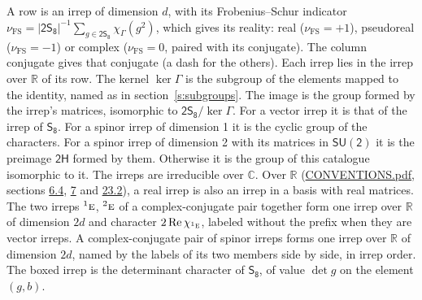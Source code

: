 \documentclass[10pt,a4paper]{article}
\numberwithin{equation}{section}
\newcommand{\grp}[1]{\mathsf{#1}}
\newcommand{\irr}[1]{\text{\normalfont\scshape #1}}
\newcommand{\conjpair}[1]{{}^{#1}}
\newcommand{\irchar}[1]{\chi_{#1}}
\newcommand{\fsind}{\nu_{\mathrm{FS}}}
\begin{document}
\leavevmode\label{n:index.frobenius}\label{n:head.irrep}\label{n:head.reality}A row is an irrep of dimension $d$, with its Frobenius--Schur indicator $\fsind = |\grp{2S_{8}}|^{-1}\allowbreak\sum_{g\in\grp{2S_{8}}}\irchar{\Gamma}(g^2)$, which gives its reality: real ($\fsind = +1$), pseudoreal ($\fsind = -1$) or complex ($\fsind = 0$, paired with its conjugate). \label{n:head.conjugate}The column conjugate gives that conjugate (a dash for the others). \label{n:head.over.real}Each irrep lies in the irrep over $\mathbb{R}$ of its row. \label{n:head.kernel}The kernel $\ker\Gamma$ is the subgroup of the elements mapped to the identity, named as in section~\ref{s:subgroups}. \label{n:head.image}The image is the group formed by the irrep's matrices, isomorphic to $\grp{2S_{8}}/\ker\Gamma$. For a vector irrep it is that of the irrep of \href{../../../rotation/data/pdf/S8.pdf}{$\grp{S_{8}}$}. For a spinor irrep of dimension 1 it is the cyclic group of the characters. For a spinor irrep of dimension 2 with its matrices in $\grp{SU(2)}$ it is the preimage $\grp{2H}$ formed by them. Otherwise it is the group of this catalogue isomorphic to it. The irreps are irreducible over $\mathbb{C}$. Over $\mathbb{R}$ (\href{../../CONVENTIONS.pdf}{CONVENTIONS.pdf}, sections \href{../../../rotation/CONVENTIONS.pdf\#conv.6.4}{6.4}, \href{../../../rotation/CONVENTIONS.pdf\#conv.7}{7} and \href{../../CONVENTIONS.pdf\#conv.23.2}{23.2}), a real irrep is also an irrep in a basis with real matrices. The two irreps $\conjpair{1}\irr{e}$, $\conjpair{2}\irr{e}$ of a complex-conjugate pair together form one irrep over $\mathbb{R}$ of dimension $2d$ and character $2\operatorname{Re}\irchar{\conjpair{1}\irr{e}}$, labeled without the prefix when they are vector irreps. A complex-conjugate pair of spinor irreps forms one irrep over $\mathbb{R}$ of dimension $2d$, named by the labels of its two members side by side, in irrep order. \label{n:mark.determinant}The boxed irrep is the determinant character of \href{../../../rotation/data/pdf/S8.pdf}{$\grp{S_{8}}$}, of value $\det g$ on the element $(g, b)$.
\setlength{\emergencystretch}{2em}\par\setlength{\emergencystretch}{0pt}
\end{document}
